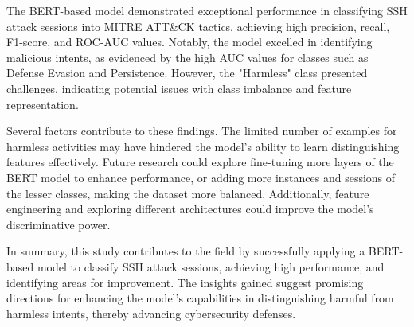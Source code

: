         The BERT-based model demonstrated exceptional performance in classifying SSH attack sessions into MITRE ATT\&CK tactics, achieving high precision, recall, F1-score, and ROC-AUC values. Notably, the model excelled in identifying malicious intents, as evidenced by the high AUC values for classes such as Defense Evasion and Persistence. However, the "Harmless" class presented challenges, indicating potential issues with class imbalance and feature representation.

        Several factors contribute to these findings. The limited number of examples for harmless activities may have hindered the model's ability to learn distinguishing features effectively. Future research could explore fine-tuning more layers of the BERT model to enhance performance, or adding more instances and sessions of the lesser classes, making the dataset more balanced. Additionally, feature engineering and exploring different architectures could improve the model's discriminative power.

        In summary, this study contributes to the field by successfully applying a BERT-based model to classify SSH attack sessions, achieving high performance, and identifying areas for improvement. The insights gained suggest promising directions for enhancing the model's capabilities in distinguishing harmful from harmless intents, thereby advancing cybersecurity defenses.
